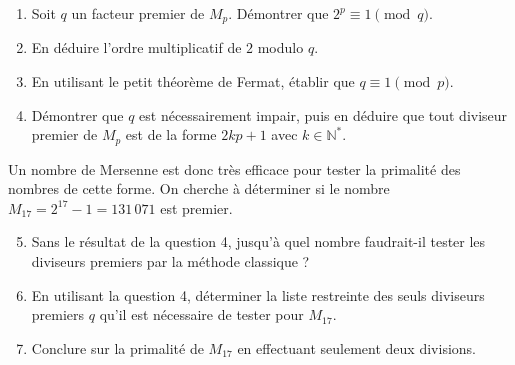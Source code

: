 \documentclass[12pt,a4paper]{article}
\begin{document}
\begin{enumerate}
    \item Soit $q$ un facteur premier de $M_p$. Démontrer que $2^p \equiv 1 \pmod q$.
    \item En déduire l'ordre multiplicatif de $2$ modulo $q$.
    \item En utilisant le petit théorème de Fermat, établir que $q \equiv 1 \pmod p$.
    \item Démontrer que $q$ est nécessairement impair, puis en déduire que tout diviseur premier de $M_p$ est de la forme $2kp + 1$ avec $k \in \mathbb{N}^*$.
\end{enumerate}
Un nombre de Mersenne est donc très efficace pour tester la primalité des nombres de cette forme. On cherche à déterminer si le nombre $M_{17} = 2^{17} - 1 = 131\,071$ est premier.
    \begin{enumerate}
        \setcounter{enumi}{4}
        \item Sans le résultat de la question 4, jusqu'à quel nombre faudrait-il tester les diviseurs premiers par la méthode classique ?
        \item En utilisant la question 4, déterminer la liste restreinte des seuls diviseurs premiers $q$ qu'il est nécessaire de tester pour $M_{17}$.
        \item Conclure sur la primalité de $M_{17}$ en effectuant seulement deux divisions.
    \end{enumerate}


\end{document}
